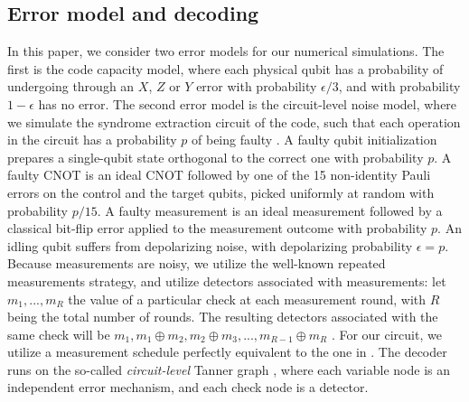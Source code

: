 \documentclass[a4paper,twocolumn,11pt,accepted=2026-05-03]{quantumarticle}
\begin{document}
\subsection{Error model and decoding}
In this paper, we consider two error models for our numerical simulations. The first is the code capacity model, where each physical qubit has a probability of undergoing through an $X$, $Z$ or $Y$ error with probability $\epsilon/3$, and with probability $1-\epsilon$ has no error. The second error model is the circuit-level noise model, where we simulate the syndrome extraction circuit of the code, such that each operation in the circuit has a probability $p$ of being faulty \cite{higgott_improved_2023}. A faulty qubit initialization prepares a single-qubit state orthogonal to the correct one with probability $p$. A faulty CNOT is an ideal CNOT followed by one of the 15 non-identity Pauli errors on the control and the target qubits, picked uniformly at random with probability $p/15$. A faulty measurement is an ideal measurement followed by a classical bit-flip error applied to the measurement outcome with probability $p$. An idling qubit suffers from depolarizing noise, with depolarizing probability $\epsilon = p$. Because measurements are noisy, we utilize the well-known repeated measurements strategy, and utilize detectors associated with measurements: let $m_1,...,m_R$ the value of a particular check at each measurement round, with $R$ being the total number of rounds. The resulting detectors associated with the same check will be $m_1, m_1\oplus m_2, m_2\oplus m_3,...,m_{R-1}\oplus m_R$ \cite{gong2024lowlatencyiterativedecodingqldpc}. For our circuit, we utilize a measurement schedule perfectly equivalent to the one in \cite{bravyi2024high}. The decoder runs on the so-called \textit{circuit-level} Tanner graph \cite{higgott_improved_2023}, where each variable node is an independent error mechanism, and each check node is a detector.
\end{document}
